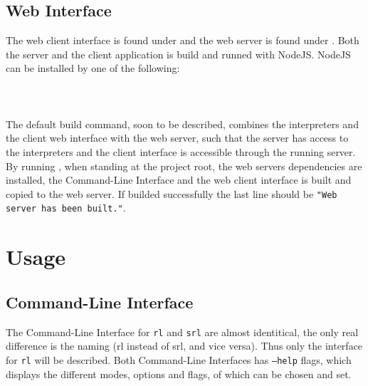 \subsection*{Web Interface}
%

The web client interface is found under  and the web server is found under .
Both the server and the client application is build and runned with NodeJS. NodeJS can be installed by one of the following:\\
\\
\\
\\

\noindent
The default build command, soon to be described, combines the interpreters and the client web interface with the web server, such that the server has access to the interpreters and the client interface is accessible through the running server.\\
By running , when standing at the project root, the web servers dependencies are installed, the Command-Line Interface and the web client interface is built and copied to the web server.
If builded successfully the last line should be \texttt{"Web server has been built."}.


\section*{Usage}
%

\subsection*{Command-Line Interface}
%

 The Command-Line Interface for \texttt{rl} and \texttt{srl} are almost identitical, the only real difference is the naming (rl instead of srl, and vice versa).
 Thus only the interface for \texttt{rl} will be described.
 Both Command-Line Interfaces has \texttt{--help} flags, which displays the different modes, options and flags, of which can be chosen and set.\\

 \\

